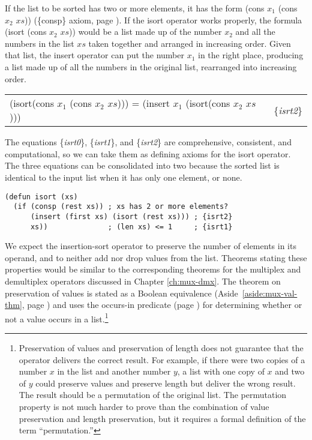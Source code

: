 If the list to be sorted has two or more elements,
it has the form (cons $x_1$ (cons $x_2$ $xs$)) (\{consp\} axiom, page \pageref{consp-axiom}).
If the isort operator works properly,
the formula (isort (cons $x_2$ $xs$)) would be
a list made up of the number $x_2$ and all the numbers in the list $xs$
taken together and
arranged in increasing order.
Given that list, the insert operator can put the number $x_1$ in
the right place, producing a list made up of all the
numbers in the original list, rearranged into increasing order.

\begin{center}
\label{eq:isrt2}
\begin{tabular}{ll}
(isort(cons $x_1$ (cons $x_2$ $xs$))) = (insert $x_1$ (isort(cons $x_2$ $xs$))) & \{\emph{isrt2}\} \\
\end{tabular}
\end{center}

The equations \{\emph{isrt0}\}, \{\emph{isrt1}\}, and \{\emph{isrt2}\}
are comprehensive, consistent, and computational,
so we can take them as defining axioms for the isort operator.
The three equations can be consolidated into two because
the sorted list is identical to the input list when it has
only one element, or none.

\label{defun:isort}
\begin{Verbatim}
(defun isort (xs)
  (if (consp (rest xs)) ; xs has 2 or more elements?
      (insert (first xs) (isort (rest xs))) ; {isrt2}
      xs))              ; (len xs) <= 1     ; {isrt1}
\end{Verbatim}

We expect the insertion-sort operator to preserve
the number of elements in its operand, and to
neither add nor drop values from the list.
Theorems stating these properties would be
similar to the corresponding theorems for
the multiplex and demultiplex operators discussed
in Chapter \ref{ch:mux-dmx}.
The theorem on preservation of values is
stated as a
Boolean equivalence
(Aside~\ref{aside:mux-val-thm}, page \pageref{aside:mux-val-thm})
and uses the occurs-in predicate
(page \pageref{def:occurs-in}) for determining
whether or not a value occurs in a list.\footnote{Preservation
of values and preservation of length does not guarantee
that the operator delivers the correct result.
For example, if there were two copies of a number $x$ in the list
and another number $y$, a list with one copy of $x$
and two of $y$ could preserve values and preserve
length but deliver the wrong result.
The result should be a permutation of the original list.
The permutation property is not much harder
to prove than the combination of value preservation and length preservation,
but it requires a formal definition of the term ``permutation.''}


